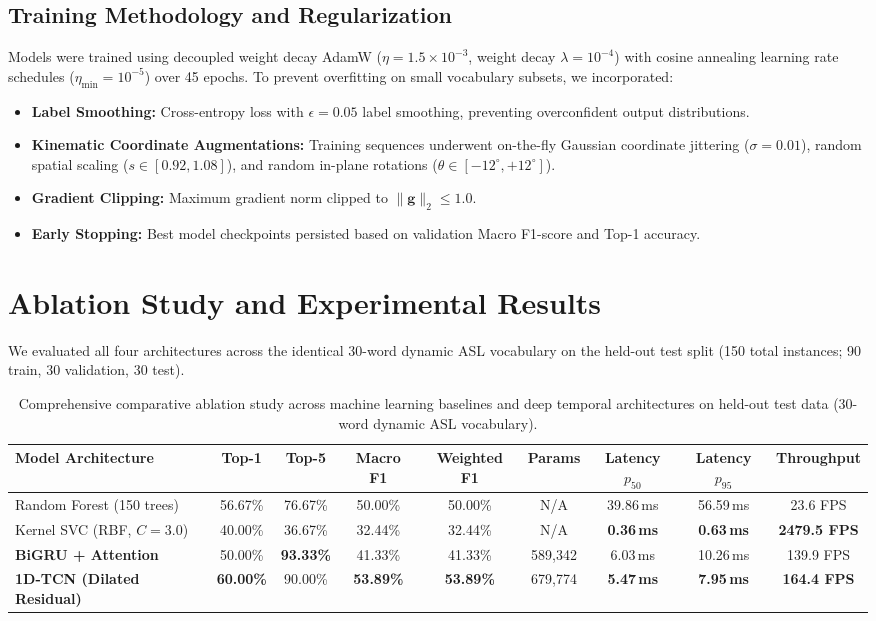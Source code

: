 \documentclass{article}
\begin{document}
\subsection*{Training Methodology and Regularization}
Models were trained using decoupled weight decay AdamW ($\eta = 1.5 \times 10^{-3}$, weight decay $\lambda = 10^{-4}$) \cite{loshchilov2017decoupled} with cosine annealing learning rate schedules ($\eta_{\min} = 10^{-5}$) over 45 epochs. To prevent overfitting on small vocabulary subsets, we incorporated:
\begin{itemize}
    \item \textbf{Label Smoothing:} Cross-entropy loss with $\epsilon = 0.05$ label smoothing, preventing overconfident output distributions.
    \item \textbf{Kinematic Coordinate Augmentations:} Training sequences underwent on-the-fly Gaussian coordinate jittering ($\sigma = 0.01$), random spatial scaling ($s \in [0.92, 1.08]$), and random in-plane rotations ($\theta \in [-12^\circ, +12^\circ]$).
    \item \textbf{Gradient Clipping:} Maximum gradient norm clipped to $\|\mathbf{g}\|_2 \le 1.0$.
    \item \textbf{Early Stopping:} Best model checkpoints persisted based on validation Macro F1-score and Top-1 accuracy.
\end{itemize}

\section*{Ablation Study and Experimental Results}
We evaluated all four architectures across the identical 30-word dynamic ASL vocabulary on the held-out test split (150 total instances; 90 train, 30 validation, 30 test). 

\begin{table}[h]
\centering
\small
\begin{tabular}{lcccccccc}
\toprule
\textbf{Model Architecture} & \textbf{Top-1} & \textbf{Top-5} & \textbf{Macro F1} & \textbf{Weighted F1} & \textbf{Params} & \textbf{Latency $p_{50}$} & \textbf{Latency $p_{95}$} & \textbf{Throughput} \\
\midrule
Random Forest (150 trees) & 56.67\% & 76.67\% & 50.00\% & 50.00\% & N/A & 39.86\,ms & 56.59\,ms & 23.6 FPS \\
Kernel SVC (RBF, $C=3.0$) & 40.00\% & 36.67\% & 32.44\% & 32.44\% & N/A & \textbf{0.36\,ms} & \textbf{0.63\,ms} & \textbf{2479.5 FPS} \\
\textbf{BiGRU + Attention} & 50.00\% & \textbf{93.33\%} & 41.33\% & 41.33\% & 589,342 & 6.03\,ms & 10.26\,ms & 139.9 FPS \\
\textbf{1D-TCN (Dilated Residual)} & \textbf{60.00\%} & 90.00\% & \textbf{53.89\%} & \textbf{53.89\%} & 679,774 & \textbf{5.47\,ms} & \textbf{7.95\,ms} & \textbf{164.4 FPS} \\
\bottomrule
\end{tabular}
\caption{Comprehensive comparative ablation study across machine learning baselines and deep temporal architectures on held-out test data (30-word dynamic ASL vocabulary).}
\label{tab:ablation}
\end{table}
\end{document}
